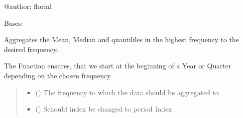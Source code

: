 \documentclass[letterpaper,10pt,english]{sphinxmanual}
\begin{document}
\sphinxAtStartPar
@author: florinl

\begin{fulllineitems}
\label{\detokenize{MUFBVAR:MUFBVAR.mufbvar.multifrequency_var}}
\pysigstartsignatures
{}
\pysigstopsignatures
\sphinxAtStartPar
Bases: 

\begin{fulllineitems}
\label{\detokenize{MUFBVAR:MUFBVAR.mufbvar.multifrequency_var.aggregate}}
\pysigstartsignatures
{}
\pysigstopsignatures
\sphinxAtStartPar
Aggregates the Mean, Median and quantililes in the highest frequency to the desired frequency.

\sphinxAtStartPar
The Function ensures, that we start at the beginning of a Year or Quarter depending on the chosen frequency
\begin{quote}\begin{description}
\begin{itemize}
\item {} 
\sphinxAtStartPar
{} () \textendash{} The frequency to which the data should be aggregated to

\item {} 
\sphinxAtStartPar
{} () \textendash{} Schould index be changed to period Index

\end{itemize}


\end{description}
\end{quote}
\end{fulllineitems}
\end{fulllineitems}
\end{document}
